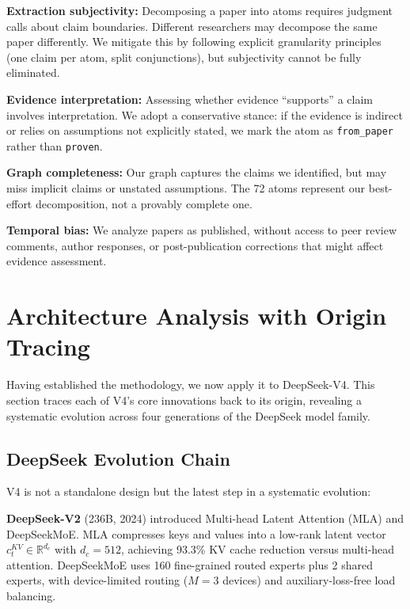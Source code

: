 \documentclass[11pt,a4paper]{article}
\begin{document}
\textbf{Extraction subjectivity:} Decomposing a paper into atoms requires judgment calls about claim boundaries. Different researchers may decompose the same paper differently. We mitigate this by following explicit granularity principles (one claim per atom, split conjunctions), but subjectivity cannot be fully eliminated.

\textbf{Evidence interpretation:} Assessing whether evidence ``supports'' a claim involves interpretation. We adopt a conservative stance: if the evidence is indirect or relies on assumptions not explicitly stated, we mark the atom as \texttt{from\_paper} rather than \texttt{proven}.

\textbf{Graph completeness:} Our graph captures the claims we identified, but may miss implicit claims or unstated assumptions. The 72 atoms represent our best-effort decomposition, not a provably complete one.

\textbf{Temporal bias:} We analyze papers as published, without access to peer review comments, author responses, or post-publication corrections that might affect evidence assessment.

\section{Architecture Analysis with Origin Tracing}
\label{sec:architecture}

Having established the methodology, we now apply it to DeepSeek-V4. This section traces each of V4's core innovations back to its origin, revealing a systematic evolution across four generations of the DeepSeek model family.

\subsection{DeepSeek Evolution Chain}
\label{sec:evolution}

V4 is not a standalone design but the latest step in a systematic evolution:

\textbf{DeepSeek-V2} (236B, 2024) introduced Multi-head Latent Attention (MLA) and DeepSeekMoE. MLA compresses keys and values into a low-rank latent vector $c_t^{KV} \in \mathbb{R}^{d_c}$ with $d_c=512$, achieving 93.3\% KV cache reduction versus multi-head attention. DeepSeekMoE uses 160 fine-grained routed experts plus 2 shared experts, with device-limited routing ($M=3$ devices) and auxiliary-loss-free load balancing.
\end{document}
